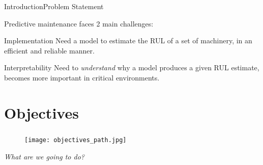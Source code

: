 \documentclass{beamer}
\begin{document}
        \begin{frame}{Introduction}{Problem Statement}

            Predictive maintenance faces 2 main challenges:
            \begin{block}{Implementation}
                Need a model to estimate the RUL of a set of machinery, in an efficient and reliable manner.
            \end{block}

            \begin{alertblock}{Interpretability}
                Need to \textit{understand} why a model produces a given RUL estimate, becomes more important in critical environments.
            \end{alertblock}

        \end{frame}

    \section{Objectives}

        {
            \begin{frame}
                \frametitle{\insertsection}
                \begin{figure}
                    \centering
                    \texttt{[image: objectives\_path.jpg]}
                \end{figure}
                \begin{center}
                    \textit{What are we going to do?}
                \end{center}
            \end{frame}
        }
\end{document}

